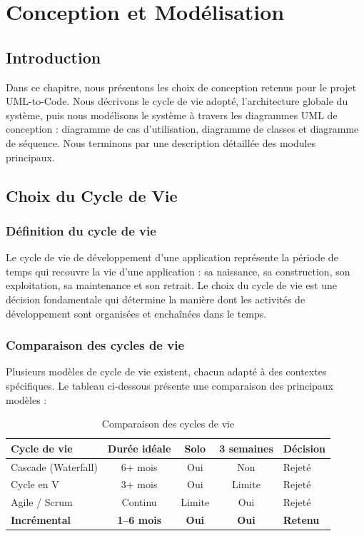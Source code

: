 \chapter{Conception et Modélisation}

\section*{Introduction}

Dans ce chapitre, nous présentons les choix de conception retenus pour le projet UML-to-Code. Nous décrivons le cycle de vie adopté, l'architecture globale du système, puis nous modélisons le système à travers les diagrammes UML de conception : diagramme de cas d'utilisation, diagramme de classes et diagramme de séquence. Nous terminons par une description détaillée des modules principaux.

\section{Choix du Cycle de Vie}

\subsection{Définition du cycle de vie}

Le cycle de vie de développement d'une application représente la période de temps qui recouvre la vie d'une application : sa naissance, sa construction, son exploitation, sa maintenance et son retrait. Le choix du cycle de vie est une décision fondamentale qui détermine la manière dont les activités de développement sont organisées et enchaînées dans le temps.

\subsection{Comparaison des cycles de vie}

Plusieurs modèles de cycle de vie existent, chacun adapté à des contextes spécifiques. Le tableau ci-dessous présente une comparaison des principaux modèles :

\begin{table}[htbp]
\centering
\renewcommand{\arraystretch}{1.4}
\begin{tabular}{|l|c|c|c|l|}
\hline
\rowcolor{gray!30}
\textbf{Cycle de vie} & \textbf{Durée idéale} & \textbf{Solo} & \textbf{3 semaines} & \textbf{Décision} \\
\hline
Cascade (Waterfall) & 6+ mois & Oui & Non & Rejeté \\
\hline
Cycle en V & 3+ mois & Oui & Limite & Rejeté \\
\hline
Agile / Scrum & Continu & Limite & Oui & Rejeté \\
\hline
\textbf{Incrémental} & \textbf{1--6 mois} & \textbf{Oui} & \textbf{Oui} & \textbf{Retenu} \\
\hline
\end{tabular}
\caption{Comparaison des cycles de vie}
\end{table}

